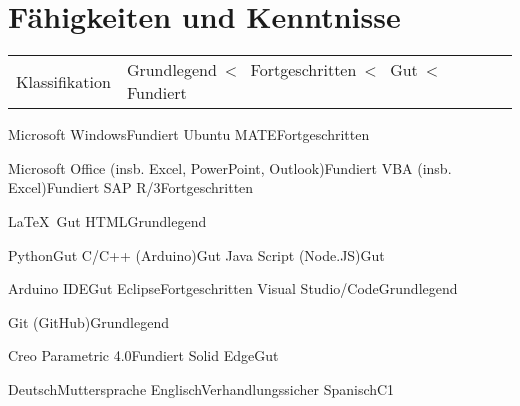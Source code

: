 
\section*{Fähigkeiten und Kenntnisse}
\medskip



\newcommand{\grundlegend}{Grundlegend}
\newcommand{\fortgeschritten}{Fortgeschritten}
\newcommand{\gut}{Gut}
\newcommand{\fundiert}{Fundiert}


\noindent
\begin{tabular*}{\textwidth}{@{}R{\BrErsteSpSkills}|lll}
	\noindent
	{\small Klassifikation}	&	{\small \grundlegend\ \textless~ \fortgeschritten\ \textless~ \gut\ \textless~ \fundiert\ }
\end{tabular*}
\vspace{0.5cm}


	{Microsoft Windows}{\fundiert}
	{Ubuntu MATE}{\fortgeschritten}
	{}{}
	{}{}



%
	{Microsoft Office (insb. Excel, PowerPoint, Outlook)}{\fundiert}
	{VBA (insb. Excel)}{\fundiert}
	{SAP R/3}{\fortgeschritten}
	{}{}
	

%
	{\LaTeX\ }{\gut}
	{HTML}{\grundlegend}
	{}{}
	{}{}
	

%
	{Python}{\gut}	
	{C/C++ (Arduino)}{\gut}
	{Java Script (Node.JS)}{\gut}
	{}{}



	{Arduino IDE}{\gut}	
	{Eclipse}{\fortgeschritten}
	{Visual Studio/Code}{\grundlegend}
	{}{}


	{Git (GitHub)}{\grundlegend}
	{}{}
	{}{}
	{}{}
	
	
	{Creo Parametric 4.0}{\fundiert}
	{Solid Edge}{\gut}
	{}{}
	{}{}
	


	{Deutsch}{Muttersprache}
	{Englisch}{Verhandlungssicher}
	{Spanisch}{C1}
	{}{}
	
	
	
